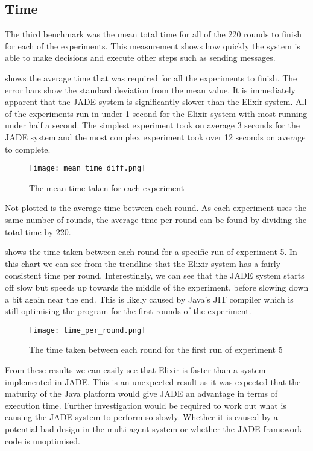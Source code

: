 \subsection{Time}

The third benchmark was the mean total time for all of the 220 rounds to finish for each of the experiments.
This measurement shows how quickly the system is able to make decisions and execute other steps such as sending messages.

 shows the average time that was required for all the experiments to finish.
The error bars show the standard deviation from the mean value.
It is immediately apparent that the JADE system is significantly slower than the Elixir system.
All of the experiments run in under 1 second for the Elixir system with most running under half a second.
The simplest experiment took on average 3 seconds for the JADE system and the most complex experiment took over 12 seconds on average to complete.

\begin{figure}[ht]
    \centering
    \texttt{[image: mean\_time\_diff.png]}
    \caption{The mean time taken for each experiment}\label{fig:mean_time_diff}
\end{figure}

Not plotted is the average time between each round.
As each experiment uses the same number of rounds, the average time per round can be found by dividing the total time by 220.

 shows the time taken between each round for a specific run of experiment 5.
In this chart we can see from the trendline that the Elixir system has a fairly consistent time per round.
Interestingly, we can see that the JADE system starts off slow but speeds up towards the middle of the experiment, before slowing down a bit again near the end.
This is likely caused by Java's JIT compiler which is still optimising the program for the first rounds of the experiment.

\begin{figure}[ht]
    \centering
    \texttt{[image: time\_per\_round.png]}
    \caption{The time taken between each round for the first run of experiment 5}\label{fig:time_per_round}
\end{figure}

From these results we can easily see that Elixir is faster than a system implemented in JADE\@.
This is an unexpected result as it was expected that the maturity of the Java platform would give JADE an advantage in terms of execution time.
Further investigation would be required to work out what is causing the JADE system to perform so slowly.
Whether it is caused by a potential bad design in the multi-agent system or whether the JADE framework code is unoptimised.
